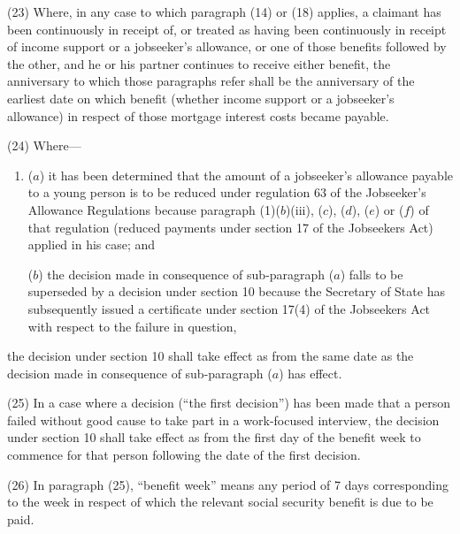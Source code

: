 \documentclass[12pt,a4paper]{article}
\begin{document}
(23) Where, in any case to which paragraph (14) or (18) applies, a claimant has been continuously in receipt of, or treated as having been continuously in receipt of income support or a jobseeker’s allowance, or one of those benefits followed by the other, and he or his partner continues to receive either benefit, the anniversary to which those paragraphs refer shall be the anniversary of the earliest date on which benefit (whether income support or a jobseeker’s allowance) in respect of those mortgage interest costs became payable.

(24) Where—
\begin{enumerate}\item[]
($a$) it has been determined that the amount of a jobseeker’s allowance payable to a young person is to be reduced under regulation 63 of the Jobseeker’s Allowance Regulations because paragraph (1)($b$)(iii), ($c$), ($d$), ($e$) or ($f$) of that regulation (reduced payments under section 17 of the Jobseekers Act) applied in his case; and

($b$) the decision made in consequence of sub-paragraph ($a$) falls to be superseded by a decision under section 10 because the Secretary of State has subsequently issued a certificate under section 17(4) of the Jobseekers Act with respect to the failure in question,
\end{enumerate}
the decision under section 10 shall take effect as from the same date as the decision made in consequence of sub-paragraph ($a$) has effect.

(25) In a case where a decision (“the first decision”) has been made that a person failed without good cause to take part in a work-focused interview, the decision under section 10 shall take effect as from the first day of the benefit week to commence for that person following the date of the first decision.

(26) In paragraph (25), “benefit week” means any period of 7 days corresponding to the week in respect of which the relevant social security benefit is due to be paid.
\end{document}
